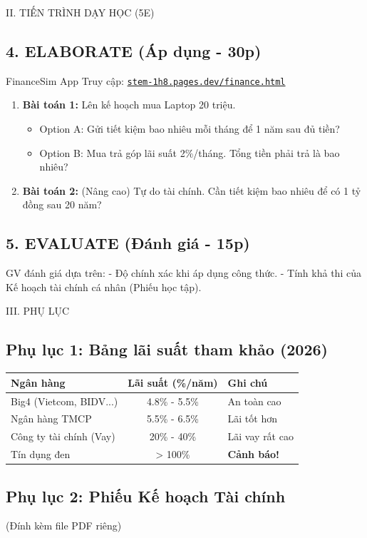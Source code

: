 \documentclass[12pt,a4paper]{article}
\begin{document}
\begin{sectionbox}{II. TIẾN TRÌNH DẠY HỌC (5E)}
\subsection*{4. ELABORATE (Áp dụng - 30p)}
\begin{activitybox}{FinanceSim App}
Truy cập: \href{https://stem-1h8.pages.dev/finance.html}{\texttt{stem-1h8.pages.dev/finance.html}}
\begin{enumerate}
    \item \textbf{Bài toán 1:} Lên kế hoạch mua Laptop 20 triệu.
    \begin{itemize}
        \item Option A: Gửi tiết kiệm bao nhiêu mỗi tháng để 1 năm sau đủ tiền?
        \item Option B: Mua trả góp lãi suất 2\%/tháng. Tổng tiền phải trả là bao nhiêu?
    \end{itemize}
    \item \textbf{Bài toán 2:} (Nâng cao) Tự do tài chính. Cần tiết kiệm bao nhiêu để có 1 tỷ đồng sau 20 năm?
\end{enumerate}
\end{activitybox}

\subsection*{5. EVALUATE (Đánh giá - 15p)}
GV đánh giá dựa trên:
- Độ chính xác khi áp dụng công thức.
- Tính khả thi của Kế hoạch tài chính cá nhân (Phiếu học tập).
\end{sectionbox}

\newpage
\begin{sectionbox}{III. PHỤ LỤC}
\subsection*{Phụ lục 1: Bảng lãi suất tham khảo (2026)}
\begin{center}
\begin{tabular}{|l|c|l|}
\hline
\textbf{Ngân hàng} & \textbf{Lãi suất (\%/năm)} & \textbf{Ghi chú} \\
\hline
Big4 (Vietcom, BIDV...) & 4.8\% - 5.5\% & An toàn cao \\
Ngân hàng TMCP & 5.5\% - 6.5\% & Lãi tốt hơn \\
Công ty tài chính (Vay) & 20\% - 40\% & Lãi vay rất cao \\
Tín dụng đen & > 100\% & \textbf{Cảnh báo!} \\
\hline
\end{tabular}
\end{center}

\subsection*{Phụ lục 2: Phiếu Kế hoạch Tài chính}
(Đính kèm file PDF riêng)
\end{sectionbox}
\end{document}
